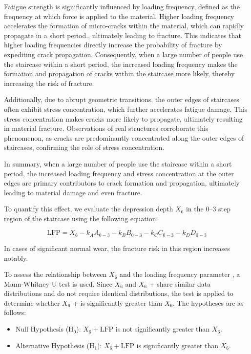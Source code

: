 \documentclass{mcmthesis}
\begin{document}
Fatigue strength is significantly influenced by loading frequency, defined as the frequency at which force is applied to the
material\cite{Yokobori1976}\cite{Takezono1980}\cite{HeimbachHeimbach+1970+377+380}. Higher loading frequency accelerates the formation of micro-cracks within the material, which can rapidly propagate in a short
period\cite{ SJESAC88A958454EEE1CD4ED092FB8A0E8F8}.\cite{ SJESF46245B4D88236414B6977C781CEC048}, ultimately leading to fracture. This indicates that higher loading frequencies directly increase the probability of fracture by expediting crack propagation. Consequently, when a large number of people use the staircase within a short period, the increased loading frequency makes the formation and propagation of cracks within the staircase more likely, thereby increasing the risk of fracture.

Additionally, due to abrupt geometric transitions, the outer edges of staircases often exhibit stress concentration, which further accelerates fatigue damage. This stress concentration makes cracks more likely to propagate, ultimately resulting in material fracture. Observations of real structures corroborate this phenomenon, as cracks are predominantly concentrated along the outer edges of staircases, confirming the role of stress concentration.

In summary, when a large number of people use the staircase within a short period, the increased loading frequency and stress concentration at the outer edges are primary contributors to crack formation and propagation, ultimately leading to material damage and even fracture.

To quantify this effect, we evaluate the depression depth $X_6$ in the 0–3 step region of the staircase using the following equation:


\[\text{LFP} = X_6 - k_A A_{0-3} - k_B B_{0-3} - k_C C_{0-3} - k_D D_{0-3}\]


In cases of significant normal wear, the fracture risk in this region increases notably. 

To assess the relationship between $X_6$ and the loading frequency parameter , a Mann-Whitney U test is used. Since $X_6$ and $X_6$ +  share similar data distributions and do not require identical distributions, the test is applied to determine whether $X_6$ +  is significantly greater than $X_6$. The hypotheses are as follows:


\begin{itemize} 
\item Null Hypothesis (H\(_0\)): \(X_6 + \text{LFP}\) is not significantly greater than \(X_6\). 
\item Alternative Hypothesis (H\(_1\)): \(X_6 + \text{LFP}\) is significantly greater than \(X_6\). 
\end{itemize}
\end{document}
